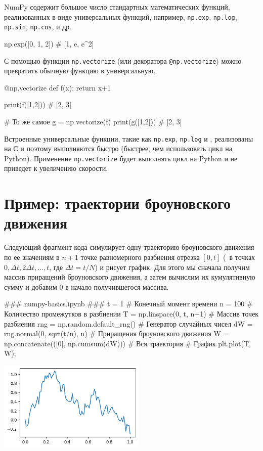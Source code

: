 NumPy содержит большое число стандартных математических функций, реализованных в виде универсальных функций, например, \verb"np.exp", \verb"np.log", \verb"np.sin", \verb"np.cos", и др.
\begin{python}
np.exp([0, 1, 2])       # [1, e, e^2]
\end{python}

С помощью функции \verb"np.vectorize" (или декоратора \verb"@np.vectorize") можно превратить обычную функцию в универсальную.
\begin{python}
@np.vectorize
def f(x):
    return x+1

print(f([1,2]))     # [2, 3]

# То же самое
g = np.vectorize(f)
print(g([1,2]))     # [2, 3]
\end{python}

\begin{remark}
Встроенные универсальные функции, такие как \verb"np.exp", \verb"np.log" и \td, реализованы на С и поэтому выполняются быстро (быстрее, чем использовать цикл на Python).
Применение \verb"np.vectorize" будет выполнять цикл на Python и не приведет к увеличению скорости.
\end{remark}


\section{Пример: траектории броуновского движения}
Следующий фрагмент кода симулирует одну траекторию броуновского движения по ее значениям в $n+1$ точке равномерного разбиения отрезка $[0, t]$ (\te\ в точках $0, \Delta t, 2\Delta t,\ldots, t$, где $\Delta t = t/N$) и рисует график.
Для этого мы сначала получим массив приращений броуновского движения, а затем вычислим их кумулятивную сумму и добавим 0 в начало получившегося массива.

\begin{python}
### numpy-basics.ipynb ###
t = 1                                # Конечный момент времени
n = 100                              # Количество промежутков в разбиении
T = np.linspace(0, t, n+1)           # Массив точек разбиения
rng = np.random.default_rng()        # Генератор случайных чисел
dW = rng.normal(0, sqrt(t/n), n)     # Приращения броуновского движения
W = np.concatenate(([0], np.cumsum(dW)))  # Вся траектория
# График
plt.plot(T, W);
\end{python}

\noindent
\includegraphics[width=7cm]{pic/bm-path.png}

